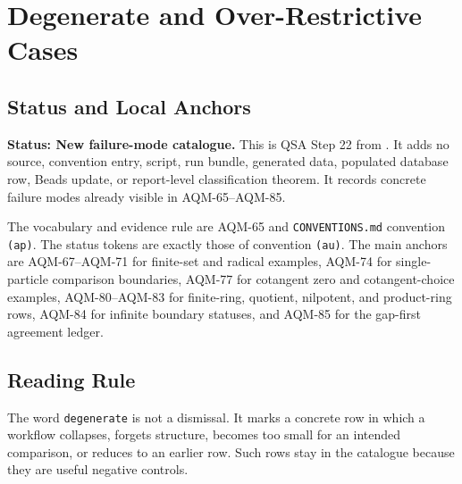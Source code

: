
\section{Degenerate and Over-Restrictive Cases}
\label{sec:qsa-degenerate-overrestrictive-cases}

\subsection{Status and Local Anchors}

\textbf{Status: New failure-mode catalogue.}  This is QSA Step 22 from
.  It adds no source,
convention entry, script, run bundle, generated data, populated database row,
Beads update, or report-level classification theorem.  It records concrete
failure modes already visible in AQM-65--AQM-85.

The vocabulary and evidence rule are AQM-65 and \texttt{CONVENTIONS.md}
convention \texttt{(ap)}.  The status tokens are exactly those of convention
\texttt{(au)}.  The main anchors are AQM-67--AQM-71 for finite-set and
radical examples, AQM-74 for single-particle comparison boundaries, AQM-77
for cotangent zero and cotangent-choice examples, AQM-80--AQM-83 for
finite-ring, quotient, nilpotent, and product-ring rows, AQM-84 for infinite
boundary statuses, and AQM-85 for the gap-first agreement ledger.

\subsection{Reading Rule}

The word \texttt{degenerate} is not a dismissal.  It marks a concrete row in
which a workflow collapses, forgets structure, becomes too small for an
intended comparison, or reduces to an earlier row.  Such rows stay in the
catalogue because they are useful negative controls.

